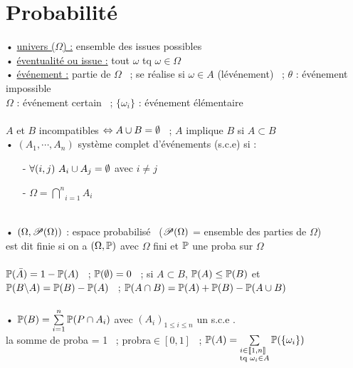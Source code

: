 \documentclass[12 pt]{exampleclass}
\begin{document}
\section{Probabilité}

\begin{flushleft}
\begin{doublespace}

	• \underline{univers ($\Omega$) :} ensemble des issues possibles\\
	• \underline{éventualité ou issue :} tout $\omega$ tq $\omega\in\Omega$\\
	• \underline{ événement :} partie de $\Omega$ \ ; se réalise si $\omega\in A$ (lévénement) \ ; $\theta$ : événement impossible\\
	$\Omega$ : événement certain \ ; $\{\omega_i\}$ : événement élémentaire\\
	\text{ }\\
	$A$ et $B$ incompatibles $\Leftrightarrow A\cup B = \emptyset$ \ ; $A$ implique $B$ si $A\subset B$\\
	• $(A_1,\cdots,A_n)$ système complet d'événements (s.c.e) si :
	\begin{itemize}
		\item[-] $\forall (i,j) \ A_i \cup A_j = \emptyset$ avec $i \ne j$
		\item[-] $\Omega = \underset{i = 1}{\overset{n}{\bigcap}} A_i$
	\end{itemize}

	\text{ }\\
	• $(\Omega , \mathscr{P}(\Omega))$ : espace probabilisé \ ($\mathscr{P}(\Omega)$ = ensemble des parties de $\Omega$)\\
	\quad est dit finie si on a $(\Omega, \mathbb{P})$ avec $\Omega$ fini et $\mathbb{P}$ une proba sur $\Omega$\\
	
	\text{ }\\
	$\mathbb{P}(\bar{A}) = 1 - \mathbb{P}(A)$ \ ; $\mathbb{P}(\emptyset) = 0$ \ ; si $A \subset B$, $\mathbb{P}(A) \leq \mathbb{P}(B)$ et $\mathbb{P}(B\backslash A) = \mathbb{P}(B) - \mathbb{P}(A)$ \ ; $\mathbb{P}(A \cap B) = \mathbb{P}(A) + \mathbb{P}(B) - \mathbb{P}(A\cup B)$\\
	
	\text{ }\\
	• $ \mathbb{P}(B) = \sum\limits_{i = 1}^n \mathbb{P}(P \cap A_i)$ avec $(A_i)_{1\leq i \leq n}$ un s.c.e .\\
	la somme de proba = 1 \ ; probra$\in [0, 1]$ \ ; $\mathbb{P}(A) =\sum\limits_{\begin{subarray}{l} i\in \llbracket 1,n \rrbracket \\ \text{tq } \omega_i\in A \end{subarray}} \mathbb{P}(\{\omega_i\})$\\
	

\end{doublespace}
\end{flushleft}
\end{document}
